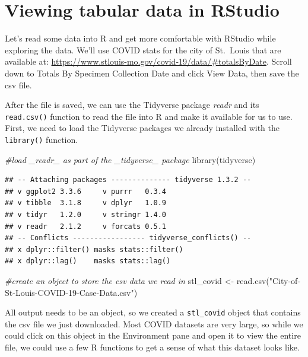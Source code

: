 \documentclass[
  krantz2]{krantz}
\makeatletter
\newenvironment{Shaded}{\begin{snugshade}}{\end{snugshade}}
\newcommand{\CommentTok}[1]{\textcolor[rgb]{0.37,0.37,0.37}{\textit{#1}}}
\newcommand{\FunctionTok}[1]{\textcolor[rgb]{0,0,0}{#1}}
\newcommand{\NormalTok}[1]{#1}
\newcommand{\OtherTok}[1]{\textcolor[rgb]{0.37,0.37,0.37}{#1}}
\newcommand{\StringTok}[1]{\textcolor[rgb]{0.5,0.5,0.5}{#1}}
\newenvironment{kframe}{%
\medskip{}
\setlength{\fboxsep}{.8em}
 \def\at@end@of@kframe{}%
 \ifinner\ifhmode%
  \def\at@end@of@kframe{\end{minipage}}%
  \begin{minipage}{\columnwidth}%
 \fi\fi%
 \def\FrameCommand##1{\hskip\@totalleftmargin \hskip-\fboxsep
 \colorbox{shadecolor}{##1}\hskip-\fboxsep
     \hskip-\linewidth \hskip-\@totalleftmargin \hskip\columnwidth}%
 \MakeFramed {\advance\hsize-\width
   \@totalleftmargin\z@ \linewidth\hsize
   \@setminipage}}%
 {\par\unskip\endMakeFramed%
 \at@end@of@kframe}
\renewenvironment{Shaded}{\begin{kframe}}{\end{kframe}}
\makeatother
\begin{document}
\hypertarget{ide-viewing}{%
\section{Viewing tabular data in RStudio}\label{ide-viewing}}

Let's read some data into R and get more comfortable with RStudio while exploring the data. We'll use COVID stats for the city of St.~Louis that are available at: \url{https://www.stlouis-mo.gov/covid-19/data/\#totalsByDate}. Scroll down to Totals By Specimen Collection Date and click View Data, then save the csv file.

After the file is saved, we can use the Tidyverse package \emph{readr} and its \texttt{read.csv()} function to read the file into R and make it available for us to use. First, we need to load the Tidyverse packages we already installed with the \texttt{library()} function.

\begin{Shaded}
\begin{Highlighting}[]
\CommentTok{\#load \_readr\_ as part of the \_tidyverse\_ package}
\FunctionTok{library}\NormalTok{(tidyverse) }
\end{Highlighting}
\end{Shaded}

\begin{verbatim}
## -- Attaching packages -------------- tidyverse 1.3.2 --
## v ggplot2 3.3.6     v purrr   0.3.4
## v tibble  3.1.8     v dplyr   1.0.9
## v tidyr   1.2.0     v stringr 1.4.0
## v readr   2.1.2     v forcats 0.5.1
## -- Conflicts ----------------- tidyverse_conflicts() --
## x dplyr::filter() masks stats::filter()
## x dplyr::lag()    masks stats::lag()
\end{verbatim}

\begin{Shaded}
\begin{Highlighting}[]
\CommentTok{\#create an object to store the csv data we read in}
\NormalTok{stl\_covid }\OtherTok{\textless{}{-}} \FunctionTok{read.csv}\NormalTok{(}\StringTok{"City{-}of{-}St{-}Louis{-}COVID{-}19{-}Case{-}Data.csv"}\NormalTok{)}
\end{Highlighting}
\end{Shaded}

All output needs to be an object, so we created a \texttt{stl\_covid} object that contains the csv file we just downloaded. Most COVID datasets are very large, so while we could click on this object in the Environment pane and open it to view the entire file, we could use a few R functions to get a sense of what this dataset looks like.
\end{document}
